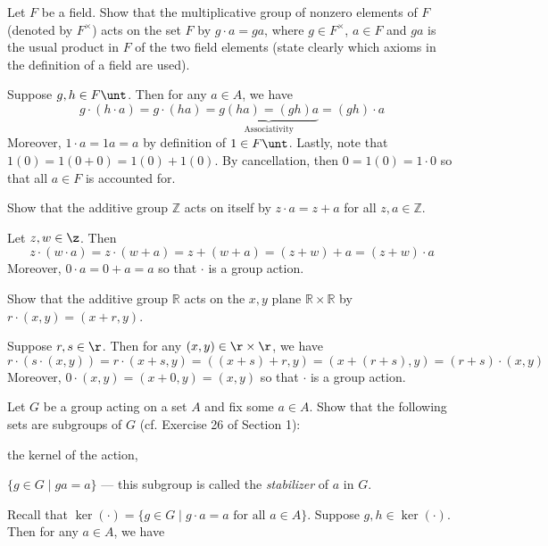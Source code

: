 \begin{problems}
    \item Let $F$ be a field. Show that the multiplicative group of nonzero elements of $F$ (denoted by $F^\times$) acts on the set $F$ by $g\cdot a = g a$, where $g\in F^\times$, $a\in F$ and $ga$ is the usual product in $F$ of the two field elements (state clearly which axioms in the definition of a field are used).
    \begin{sol}
        Suppose $g, h \in F\unt$. Then for any $a \in A$, we have
        \[g \cdot (h \cdot a) = g \cdot (ha) = \underbrace{g(ha) = (gh)a}_{\text{Associativity}} = (gh)\cdot a\]
        Moreover, $1 \cdot a = 1a = a$ by definition of $1 \in F\unt$. Lastly, note that $1(0) = 1(0 + 0) = 1(0) + 1(0)$. By cancellation, then $0 = 1(0) = 1 \cdot 0$ so that all $a \in F$ is accounted for.
    \end{sol}
    \item Show that the additive group $\mathbb{Z}$ acts on itself by $z\cdot a = z + a$ for all $z,a\in\mathbb{Z}$.
    \begin{sol}
        Let $z, w \in \z$. Then
        \[z \cdot (w \cdot a) = z \cdot (w + a) = z + (w + a) = (z + w) + a = (z + w) \cdot a\]
        Moreover, $0 \cdot a = 0 + a = a$ so that $\cdot$ is a group action.
    \end{sol}
    \item Show that the additive group $\mathbb{R}$ acts on the $x,y$ plane $\mathbb{R}\times\mathbb{R}$ by $r\cdot (x,y) = (x + r, y)$.
    \begin{sol}
        Suppose $r, s \in \r$. Then for any $(x, y) \in \r \times \r$, we have
        \[r \cdot (s \cdot (x, y)) = r \cdot (x + s, y) = ((x + s) + r, y) = (x + (r + s), y) = (r + s) \cdot (x, y)\]
        Moreover, $0 \cdot (x, y) = (x + 0, y) = (x, y)$ so that $\cdot$ is a group action.
    \end{sol}
    \item Let $G$ be a group acting on a set $A$ and fix some $a\in A$. Show that the following sets are subgroups of $G$ (cf. Exercise 26 of Section 1):
    \begin{problems}
        \item the kernel of the action,
        \item $\{g\in G \mid g a = a\}$ — this subgroup is called the \emph{stabilizer} of $a$ in $G$.
    \end{problems}
    \begin{solalph}
        \item Recall that $\ker(\cdot) = \{g \in G \mid g \cdot a = a \text{ for all } a \in A\}$. Suppose $g, h \in \ker(\cdot)$. Then for any $a \in A$, we have

\end{solalph}
\end{problems}
